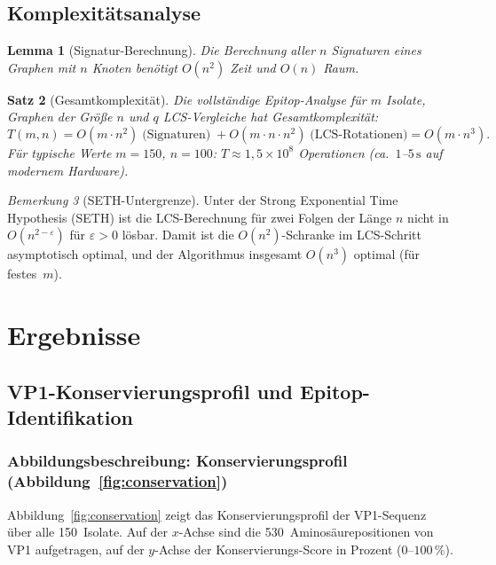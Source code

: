 ﻿\documentclass[a4paper,12pt]{article}
\theoremstyle{plain}
\newtheorem{satz}{Satz}[section]
\newtheorem{lemma}[satz]{Lemma}
\theoremstyle{definition}
\theoremstyle{remark}
\newtheorem{bemerkung}[satz]{Bemerkung}
\begin{document}
\subsection{Komplexitätsanalyse}

\begin{lemma}[Signatur-Berechnung]\label{lem:sig}
Die Berechnung aller $n$ Signaturen eines Graphen mit $n$ Knoten benötigt
$O(n^2)$ Zeit und $O(n)$ Raum.
\end{lemma}

\begin{satz}[Gesamtkomplexität]\label{satz:kompl}
Die vollständige Epitop-Analyse für $m$ Isolate, Graphen der Größe $n$
und $q$ LCS-Vergleiche hat Gesamtkomplexität:
\[
  T(m,n) = O(m \cdot n^2) \;\text{(Signaturen)}\;
          + O(m \cdot n \cdot n^2) \;\text{(LCS-Rotationen)}
          = O(m \cdot n^3).
\]
Für typische Werte $m=150$, $n=100$: $T \approx 1{,}5\times10^8$ Operationen
(ca.\ $1$--$5\,\text{s}$ auf modernem Hardware).
\end{satz}

\begin{bemerkung}[SETH-Untergrenze]
Unter der Strong Exponential Time Hypothesis (SETH) ist die LCS-Berechnung für
zwei Folgen der Länge $n$ nicht in $O(n^{2-\varepsilon})$ für $\varepsilon>0$
lösbar. Damit ist die $O(n^2)$-Schranke im LCS-Schritt asymptotisch optimal,
und der Algorithmus insgesamt $O(n^3)$ optimal (für festes~$m$).
\end{bemerkung}

\section{Ergebnisse}

\subsection{VP1-Konservierungsprofil und Epitop-Identifikation}

\subsubsection{Abbildungsbeschreibung: Konservierungsprofil (Abbildung~\ref{fig:conservation})}

Abbildung~\ref{fig:conservation} zeigt das Konservierungsprofil der VP1-Sequenz über alle
150~Isolate. Auf der $x$-Achse sind die 530~Aminosäurepositionen von VP1 aufgetragen,
auf der $y$-Achse der Konservierungs-Score in Prozent ($0$--$100\,\%$).
\end{document}
